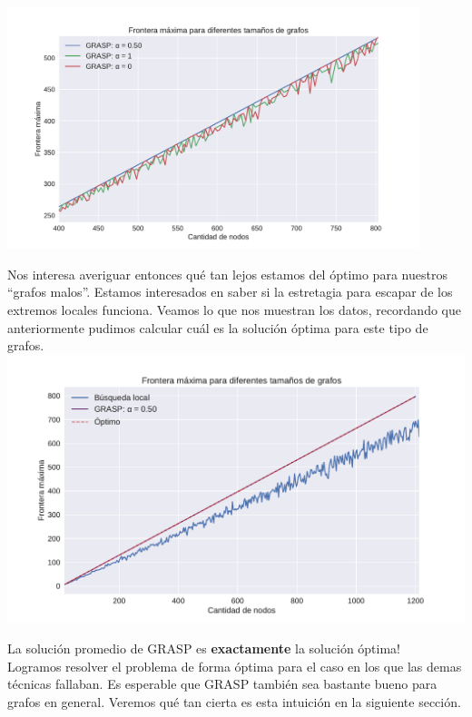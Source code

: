 
{\centering
    \includegraphics[width=0.90\textwidth]{informe/imgs/exp_malo_frontera_grasp_zoom.pdf}
}

Nos interesa averiguar entonces qué tan lejos estamos del óptimo para nuestros ``grafos malos''. Estamos interesados en saber si la estretagia para escapar de los extremos locales funciona. Veamos lo que nos muestran los datos, recordando que anteriormente pudimos calcular cuál es la solución óptima para este tipo de grafos. \\

{\centering
    \includegraphics[width=1\textwidth]{informe/imgs/exp_malo_frontera_grasp_local_optimo.pdf}
}

La solución promedio de GRASP es \textbf{exactamente} la solución óptima! \\

Logramos resolver el problema de forma óptima para el caso en los que las demas técnicas fallaban. Es esperable que GRASP también sea bastante bueno para grafos en general. Veremos qué tan cierta es esta intuición en la siguiente sección. \\

